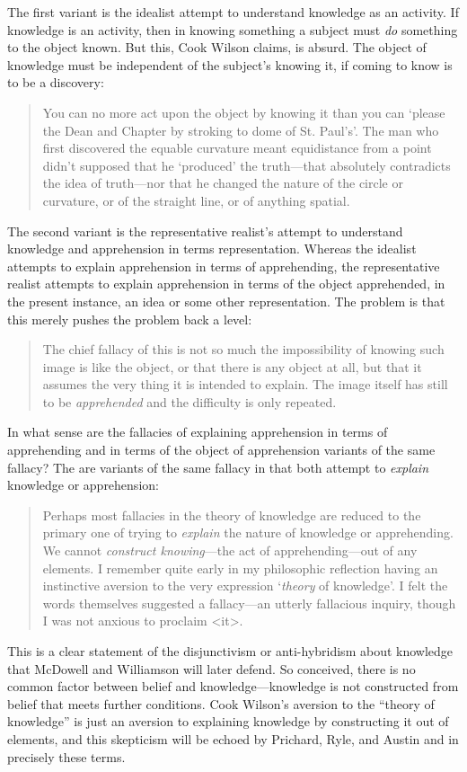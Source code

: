 The first variant is the idealist attempt to understand knowledge as an activity. If knowledge is an activity, then in knowing something a subject must \emph{do} something to the object known. But this, Cook Wilson claims, is absurd. The object of knowledge must be independent of the subject's knowing it, if coming to know is to be a discovery: 
\begin{quote}
	You can no more act upon the object by knowing it than you can `please the Dean and Chapter by stroking to dome of St. Paul's'. The man who first discovered the equable curvature meant equidistance from a point didn't supposed that he `produced' the truth---that absolutely contradicts the idea of truth---nor that he changed the nature of the circle or curvature, or of the straight line, or of anything spatial. \citep[]{Cook-Wilson:1926sf}
\end{quote}

The second variant is the representative realist's attempt to understand knowledge and apprehension in terms representation. Whereas the idealist attempts to explain apprehension in terms of apprehending, the representative realist attempts to explain apprehension in terms of the object apprehended, in the present instance, an idea or some other representation. The problem is that this merely pushes the problem back a level:
\begin{quote}
	The chief fallacy of this is not so much the impossibility of knowing such image is like the object, or that there is any object at all, but that it assumes the very thing it is intended to explain. The image itself has still to be \emph{apprehended} and the difficulty is only repeated. \citep[]{Cook-Wilson:1926sf}
\end{quote}

In what sense are the fallacies of explaining apprehension in terms of apprehending and in terms of the object of apprehension variants of the same fallacy? The are variants of the same fallacy in that both attempt to \emph{explain} knowledge or apprehension:
\begin{quote}
	Perhaps most fallacies in the theory of knowledge are reduced to the primary one of trying to \emph{explain} the nature of knowledge or apprehending. We cannot \emph{construct knowing}---the act of apprehending---out of any elements. I remember quite early in my philosophic reflection having an instinctive aversion to the very expression `\emph{theory} of knowledge'. I felt the words themselves suggested a fallacy---an utterly fallacious inquiry, though I was not anxious to proclaim <it>. \citep[]{Cook-Wilson:1926sf}
\end{quote}
This is a clear statement of the disjunctivism or anti-hybridism about knowledge that McDowell and Williamson will later defend. So conceived, there is no common factor between belief and knowledge---knowledge is not constructed from belief that meets further conditions. Cook Wilson's aversion to the ``theory of knowledge'' is just an aversion to explaining knowledge by constructing it out of elements, and this skepticism will be echoed by Prichard, Ryle, and Austin and in precisely these terms.

